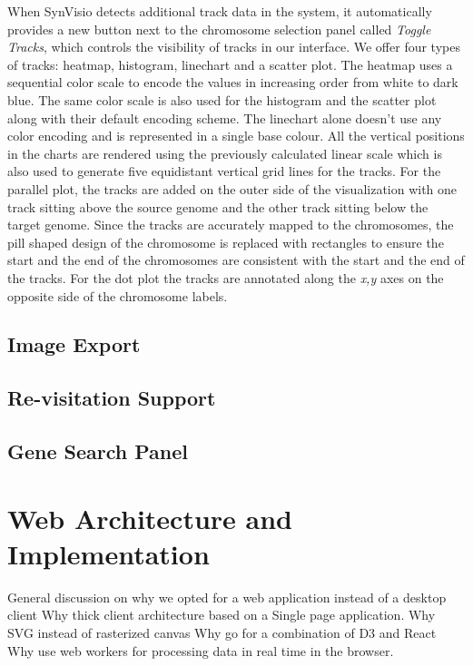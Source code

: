 When SynVisio detects additional track data in the system, it automatically provides a new button next to the chromosome selection panel called \textit{Toggle Tracks}, which controls
the visibility of tracks in our interface. We offer four types of tracks: heatmap, histogram, linechart and a scatter plot. The heatmap uses a sequential color scale to encode the values in increasing order from white to dark blue. The same color scale is also used for the histogram and the scatter plot along with their default encoding scheme. The linechart alone doesn't use any color encoding and is represented in a single base colour. All the vertical positions in the charts are rendered using the previously calculated linear scale which is also used to generate five equidistant vertical grid lines for the tracks. For the parallel plot, the tracks are added on the outer side of the visualization with one track sitting above the source genome and the other track sitting below the target genome. Since the tracks are accurately mapped to the chromosomes, the pill shaped design of the chromosome is replaced with rectangles to ensure the start and the end of the chromosomes are consistent with the start and the end of the tracks. For the dot plot the tracks are annotated along the \textit{x,y} axes on the opposite side of the chromosome labels.

\subsection{Image Export}

\subsection{Re-visitation Support}

\subsection{Gene Search Panel}

\section{Web Architecture and Implementation}
General discussion on why we opted for a web application instead of a desktop client
Why thick client architecture based on a Single page application.
Why SVG instead of rasterized canvas
Why go for a combination of D3 and React
Why use web workers for processing data in real time in the browser.

